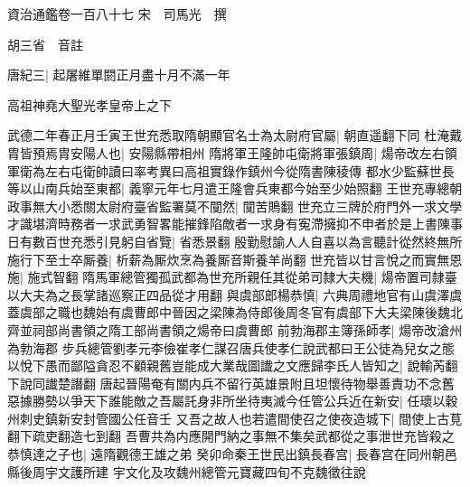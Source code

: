 資治通鑑卷一百八十七
宋　司馬光　撰

胡三省　音註

唐紀三|{
	起屠維單閼正月盡十月不滿一年}


高祖神堯大聖光孝皇帝上之下

武德二年春正月壬寅王世充悉取隋朝顯官名士為太尉府官屬|{
	朝直遥翻下同}
杜淹戴胄皆預焉胄安陽人也|{
	安陽縣帶相州}
隋將軍王隆帥屯衛將軍張鎮周|{
	煬帝改左右領軍衛為左右屯衛帥讀曰率考異曰高祖實錄作鎮州今從隋書陳稜傳}
都水少監蘇世長等以山南兵始至東都|{
	義寧元年七月遣王隆會兵東都今始至少始照翻}
王世充專總朝政事無大小悉關太尉府臺省監署莫不闃然|{
	闃苦鵙翻}
世充立三牌於府門外一求文學才識堪濟時務者一求武勇智畧能摧鋒陷敵者一求身有寃滯擁抑不申者於是上書陳事日有數百世充悉引見躬自省覽|{
	省悉景翻}
殷勤慰諭人人自喜以為言聽計從然終無所施行下至士卒厮養|{
	析薪為厮炊烹為養厮音斯養羊尚翻}
世充皆以甘言悅之而實無恩施|{
	施式智翻}
隋馬軍總管獨孤武都為世充所親任其從弟司隸大夫機|{
	煬帝置司隸臺以大夫為之長掌諸巡察正四品從才用翻}
與虞部郎楊恭慎|{
	六典周禮地官有山虞澤虞蓋虞部之職也魏始有虞曹郎中晉因之梁陳為侍郎後周冬官有虞部下大夫梁陳後魏北齊並祠部尚書領之隋工部尚書領之煬帝曰虞曹郎}
前勃海郡主簿孫師孝|{
	煬帝改滄州為勃海郡}
步兵總管劉孝元李儉崔孝仁謀召唐兵使孝仁說武都曰王公徒為兒女之態以悅下愚而鄙隘貪忍不顧親舊豈能成大業哉圖䜟之文應歸李氏人皆知之|{
	說輸芮翻下說同䜟楚譖翻}
唐起晉陽奄有關内兵不留行英雄景附且坦懷待物舉善責功不念舊惡據勝勢以爭天下誰能敵之吾屬託身非所坐待夷滅今任管公兵近在新安|{
	任瓌以穀州刺史鎮新安封管國公任音壬}
又吾之故人也若遣間使召之使夜造城下|{
	間使上古莧翻下疏吏翻造七到翻}
吾曹共為内應開門納之事無不集矣武都從之事泄世充皆殺之恭慎達之子也|{
	遠隋觀德王雄之弟}
癸卯命秦王世民出鎮長春宫|{
	長春宫在同州朝邑縣後周宇文護所建}
宇文化及攻魏州總管元寶藏四旬不克魏徵往說

